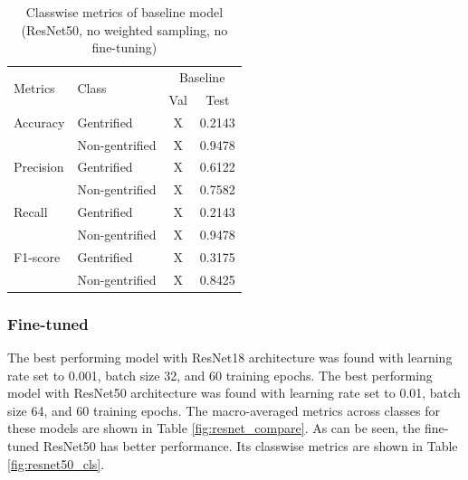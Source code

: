 \begin{table}[H]
\begin{tabular}{llcc}
\multirow{2}{*}{Metrics} & \multirow{2}{*}{Class} & \multicolumn{2}{c}{Baseline} \\ \cline{3-4} 
                         &                        & Val         & Test           \\ \hline
Accuracy                 & Gentrified             & X           & 0.2143         \\
                         & Non-gentrified         & X           & 0.9478         \\
Precision                & Gentrified             & X           & 0.6122         \\
                         & Non-gentrified         & X           & 0.7582         \\
Recall                   & Gentrified             & X           & 0.2143         \\
                         & Non-gentrified         & X           & 0.9478         \\
F1-score                 & Gentrified             & X           & 0.3175         \\
                         & Non-gentrified         & X           & 0.8425        
\end{tabular}
\caption{Classwise metrics of baseline model (ResNet50, no weighted sampling, no fine-tuning)}
\label{fig:baseline_cls}
\end{table}

\subsubsection{Fine-tuned}
The best performing model with ResNet18 architecture was found with learning rate set to 0.001, batch size 32, and 60 training epochs. The best performing model with ResNet50 architecture was found with learning rate set to 0.01, batch size 64, and 60 training epochs. The macro-averaged metrics across classes for these models are shown in Table \ref{fig:resnet_compare}. As can be seen, the fine-tuned ResNet50 has better performance. Its classwise metrics are shown in Table \ref{fig:resnet50_cls}.

